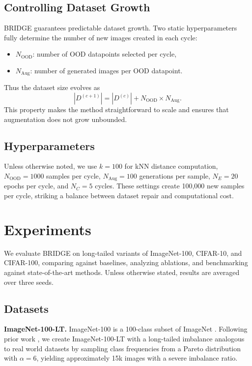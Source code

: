 \documentclass{article} %
\begin{document}
\subsection{Controlling Dataset Growth}

BRIDGE guarantees predictable dataset growth. Two static hyperparameters fully determine the number of new images created in each cycle:
\begin{itemize}
    \item $N_{\text{OOD}}$: number of OOD datapoints selected per cycle,
    \item $N_{\text{Aug}}$: number of generated images per OOD datapoint.
\end{itemize}
Thus the dataset size evolves as
\[
|D^{(c+1)}| = |D^{(c)}| + N_{\text{OOD}} \times N_{\text{Aug}}.
\]
This property makes the method straightforward to scale and ensures that augmentation does not grow unbounded.

\subsection{Hyperparameters}

Unless otherwise noted, we use $k=100$ for kNN distance computation, $N_{\text{OOD}}=1000$ samples per cycle, $N_{\text{Aug}}=100$ generations per sample, $N_E=20$ epochs per cycle, and $N_C=5$ cycles. These settings create 100,000 new samples per cycle, striking a balance between dataset repair and computational cost.



\section{Experiments}
\label{experiments}





We evaluate BRIDGE on long-tailed variants of ImageNet-100, CIFAR-10, and CIFAR-100, comparing against baselines, analyzing ablations, and benchmarking against state-of-the-art methods. Unless otherwise stated, results are averaged over three seeds.

\subsection{Datasets}

\noindent
\textbf{ImageNet-100-LT.} 
ImageNet-100 is a 100-class subset of ImageNet \citep{tian2020contrastive}. Following prior work \citep{imagenet-lt}, we create ImageNet-100-LT with a long-tailed imbalance analogous to real world datasets by sampling class frequencies from a Pareto distribution with $\alpha=6$, yielding approximately 15k images with a severe imbalance ratio.  
\end{document}
